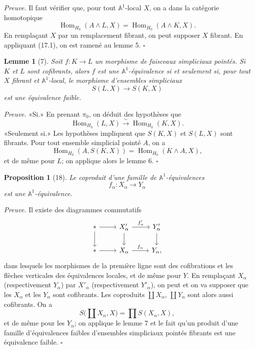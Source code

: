\documentclass[11pt]{article}
\newcommand{\Aone}{\mathbb A^1}
\newcommand{\Hom}{\operatorname{Hom}}
\theoremstyle{deligne}
\newtheorem*{proposition*}{Proposition}
\newtheorem*{lemma*}{Lemme}
\newenvironment{proofdel}{\noindent\textit{Preuve.}}{\hfill$\square$}
\begin{document}
\begin{proofdel}
Il faut vérifier que, pour tout \(\Aone\)-local \(X\), on a dans la catégorie homotopique
\[
\Hom_{H_0}(A\wedge L,X)=\Hom_{H_0}(A\wedge K,X).
\]
En remplaçant \(X\) par un remplacement fibrant, on peut supposer \(X\) fibrant. En appliquant (17.1), on est ramené au lemme 5.
\end{proofdel}

\begin{lemma*}[7]
Soit \(f:K\to L\) un morphisme de faisceaux simpliciaux pointés. Si \(K\) et \(L\) sont cofibrants, alors \(f\) est une \(\Aone\)-équivalence si et seulement si, pour tout \(X\) fibrant et \(\Aone\)-local, le morphisme d'ensembles simpliciaux
\[
S(L,X)\longrightarrow S(K,X)
\]
est une équivalence faible.
\end{lemma*}

\begin{proofdel}
«Si.» En prenant \(\pi_0\), on déduit des hypothèses que
\[
\Hom_{H_0}(L,X)\overset{\sim}{\longrightarrow}\Hom_{H_0}(K,X).
\]
«Seulement si.» Les hypothèses impliquent que \(S(K,X)\) et \(S(L,X)\) sont fibrants. Pour tout ensemble simplicial pointé \(A\), on a
\[
\Hom_{H_0}(A,S(K,X))=\Hom_{H_0}(K\wedge A,X),
\]
et de même pour \(L\); on applique alors le lemme 6.
\end{proofdel}

\begin{proposition*}[18]
Le coproduit d'une famille de \(\Aone\)-équivalences
\[
f_\alpha:X_\alpha\longrightarrow Y_\alpha
\]
est une \(\Aone\)-équivalence.
\end{proposition*}

\begin{proofdel}
Il existe des diagrammes commutatifs
\[
\begin{tikzcd}[column sep=2.5em,row sep=1.8em]
* \arrow[r] \arrow[d] & X'_\alpha \arrow[r,"f'_\alpha"] \arrow[d] & Y'_\alpha \arrow[d] \\
* \arrow[r] & X_\alpha \arrow[r,"f_\alpha"] & Y_\alpha,
\end{tikzcd}
\]
dans lesquels les morphismes de la première ligne sont des cofibrations et les flèches verticales des équivalences locales, et de même pour \(Y\). En remplaçant \(X_\alpha\) (respectivement \(Y_\alpha\)) par \(X'_\alpha\) (respectivement \(Y'_\alpha\)), on peut et on va supposer que les \(X_\alpha\) et les \(Y_\alpha\) sont cofibrants. Les coproduits \(\coprod X_\alpha\), \(\coprod Y_\alpha\) sont alors aussi cofibrants. On a
\[
S\bigl(\coprod X_\alpha,X\bigr)=\prod S(X_\alpha,X),
\]
et de même pour les \(Y_\alpha\); on applique le lemme 7 et le fait qu'un produit d'une famille d'équivalences faibles d'ensembles simpliciaux pointés fibrants est une équivalence faible.
\end{proofdel}
\end{document}
